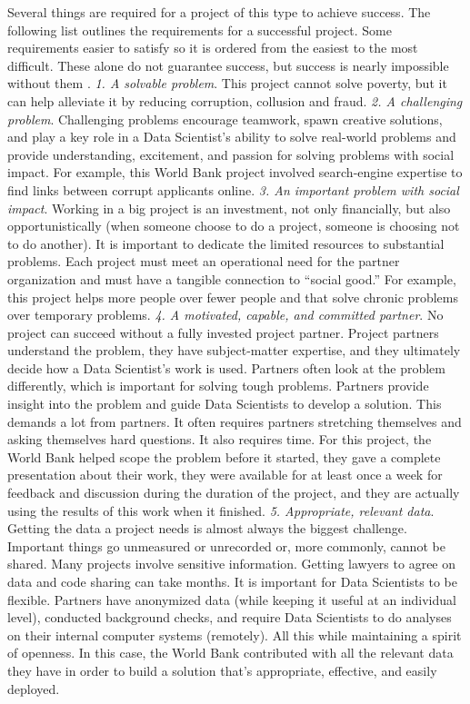 Several things are required for a project of this type to achieve success. The following list outlines the requirements for a successful project. Some requirements easier to satisfy so it is ordered from  the easiest to the most difficult. These alone do not guarantee success, but success is nearly impossible without them \parencite{dssg_proj_list}\label{dssg}.   \textit{1. A solvable problem}. This project cannot solve poverty, but it can help alleviate it by reducing corruption, collusion and fraud. 
\textit{2. A challenging problem}. Challenging problems encourage teamwork, spawn creative solutions, and play a key role in a Data Scientist's ability to solve real-world problems and provide understanding, excitement, and passion for solving problems with social impact. For example, this World Bank project involved  search-engine expertise to find links between corrupt applicants online. 
\textit{3. An important problem with social impact}. Working in a big project is an investment, not only financially, but also opportunistically (when someone choose to do a project, someone is choosing not to do another). It is important to dedicate the limited resources to substantial problems. Each project must meet an operational need for the partner organization and must have a tangible connection to ``social good.'' For example, this project helps more people over fewer people and that solve chronic problems over temporary problems. 
\textit{4. A motivated, capable, and committed partner}. No project can succeed without a fully invested project partner. Project partners understand the problem, they have subject-matter expertise, and they ultimately decide how a Data Scientist's work is used. Partners often look at the problem differently, which is important for solving tough problems.  Partners provide insight into the problem and guide Data Scientists to develop a solution. This demands a lot from partners. It often requires partners stretching themselves and asking themselves hard questions. It also requires time. For this project, the World Bank helped scope the problem before it started, they gave a complete presentation about their work, they were available for at least once a week for feedback and discussion during the duration of the project, and they are actually using the results of this work when it finished. 
\textit{5. Appropriate, relevant data}. Getting the data a project  needs is almost always the biggest challenge. Important things go unmeasured or unrecorded or, more commonly, cannot be shared. Many projects involve  sensitive information. Getting lawyers to agree on data and code sharing can take months. It is important for Data Scientists to be flexible. Partners have anonymized data (while keeping it useful at an individual level), conducted background checks, and require Data Scientists to do analyses on their internal computer systems (remotely). All this while maintaining a spirit of openness.  In this case, the World Bank contributed with all the relevant data they have in order to build a solution that's appropriate, effective, and easily deployed.

